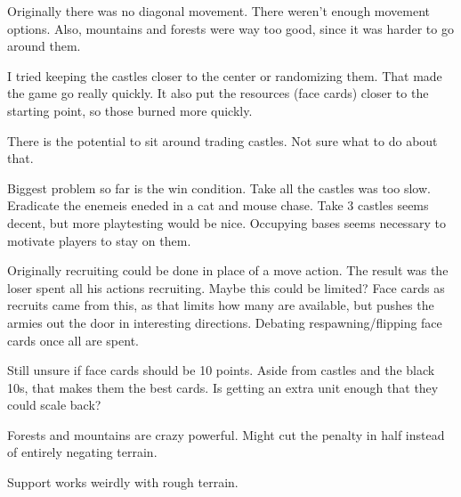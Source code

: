 \documentclass{article}
\begin{document}
Originally there was no diagonal movement.  There weren't enough movement options.  Also, mountains and forests were way too good, since it was harder to go around them.

I tried keeping the castles closer to the center or randomizing them.  That made the game go really quickly.  It also put the resources (face cards) closer to the starting point, so those burned more quickly.

There is the potential to sit around trading castles.  Not sure what to do about that.

Biggest problem so far is the win condition.  Take all the castles was too slow.  Eradicate the enemeis eneded in a cat and mouse chase.  Take 3 castles seems decent, but more playtesting would be nice.  Occupying bases seems necessary to motivate players to stay on them.

Originally recruiting could be done in place of a move action.  The result was the loser spent all his actions recruiting.  Maybe this could be limited?  Face cards as recruits came from this, as that limits how many are available, but pushes the armies out the door in interesting directions.  Debating respawning/flipping face cards once all are spent.

Still unsure if face cards should be 10 points.  Aside from castles and the black 10s, that makes them the best cards.  Is getting an extra unit enough that they could scale back?

Forests and mountains are crazy powerful.  Might cut the penalty in half instead of entirely negating terrain.

Support works weirdly with rough terrain.  
\end{document}
